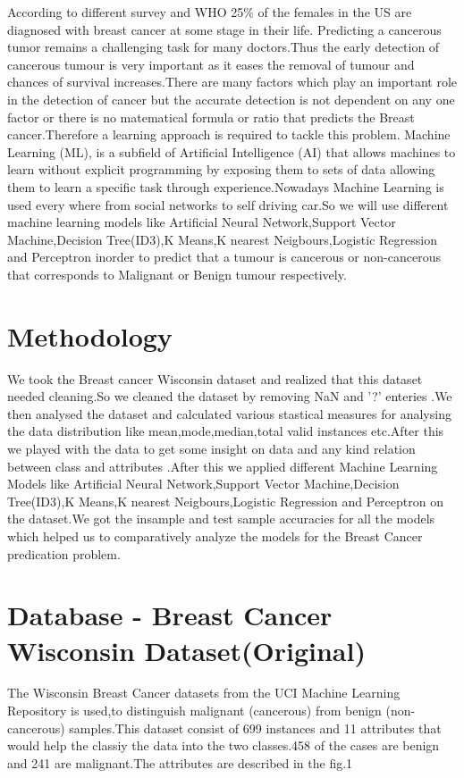\documentclass[conference,compsoc]{IEEEtran}
\begin{document}
According to different survey and WHO 25\% of the females in the US are diagnosed with breast cancer at some stage in their life. Predicting a cancerous tumor remains a challenging task for many doctors.Thus the early detection of cancerous tumour is  very important as it eases the removal of tumour and chances of survival increases.There are many factors which play  an important role in the detection of cancer but the accurate detection is not dependent on any one factor or there is no matematical formula or ratio that predicts the Breast cancer.Therefore a learning approach is required to tackle this problem.    
Machine Learning (ML), is a subfield of Artificial Intelligence (AI) that allows machines to learn without explicit
programming by exposing them to sets of data allowing
them to learn a specific task through experience.Nowadays Machine Learning is used every where from social networks to self driving car.So we will use different machine learning models like Artificial Neural Network,Support Vector Machine,Decision Tree(ID3),K Means,K nearest Neigbours,Logistic Regression and Perceptron inorder to predict that a tumour is cancerous or non-cancerous that corresponds to Malignant or Benign tumour respectively.



\section{Methodology}
	We took the Breast cancer Wisconsin dataset and realized that this dataset needed cleaning.So we cleaned the dataset by removing NaN and '?' enteries .We then analysed the dataset and calculated various stastical measures for analysing the data distribution like mean,mode,median,total valid instances etc.After this we played with the data to get some insight on data and any kind relation between class and attributes .After this we applied different Machine Learning Models like Artificial Neural Network,Support Vector Machine,Decision Tree(ID3),K Means,K nearest Neigbours,Logistic Regression and Perceptron on the dataset.We got the insample and test sample accuracies for all the models  which helped us to comparatively analyze the models for the Breast Cancer predication problem.
 

\section{Database - Breast Cancer Wisconsin Dataset(Original)}
The  Wisconsin  Breast  Cancer  datasets  from  the  UCI Machine  Learning  Repository  is  used,to  distinguish malignant (cancerous) from benign (non-cancerous) samples.This dataset consist of 699 instances and 11 attributes that would help the classiy the data into the two classes.458 of the cases are
benign and 241 are malignant.The attributes are described in the fig.1
\end{document}
